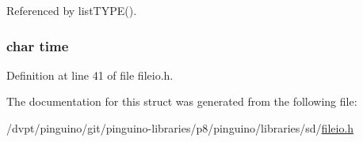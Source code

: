 Referenced by list\-T\-Y\-P\-E().

\hypertarget{struct_d_i_r_t_a_b_l_e_a969b8147d8235c322110359a8819a603}{
\subsubsection[{time}]{\setlength{\rightskip}{0pt plus 5cm}char time}}\label{struct_d_i_r_t_a_b_l_e_a969b8147d8235c322110359a8819a603}


Definition at line 41 of file fileio.\-h.



The documentation for this struct was generated from the following file\-:\begin{DoxyCompactItemize}
\item 
/dvpt/pinguino/git/pinguino-\/libraries/p8/pinguino/libraries/sd/\hyperlink{p8_2pinguino_2libraries_2sd_2fileio_8h}{fileio.\-h}\end{DoxyCompactItemize}
